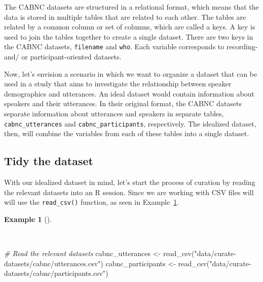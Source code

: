 \documentclass[
  letterpaper,
  DIV=11,
  numbers=noendperiod]{scrreport}
\newenvironment{Shaded}{\begin{snugshade}}{\end{snugshade}}
\newcommand{\CommentTok}[1]{\textcolor[rgb]{0.00,0.00,0.00}{\textit{#1}}}
\newcommand{\FunctionTok}[1]{\textcolor[rgb]{0.00,0.00,0.00}{#1}}
\newcommand{\NormalTok}[1]{\textcolor[rgb]{0.00,0.00,0.00}{#1}}
\newcommand{\OtherTok}[1]{\textcolor[rgb]{0.00,0.00,0.00}{#1}}
\newcommand{\StringTok}[1]{\textcolor[rgb]{0.00,0.00,0.00}{#1}}
\theoremstyle{definition}
\newtheorem{example}{Example}[chapter]
\theoremstyle{remark}
\begin{document}
The CABNC datasets are structured in a relational format, which means
that the data is stored in multiple tables that are related to each
other. The tables are related by a common column or set of columns,
which are called a keys. A key is used to join the tables together to
create a single dataset. There are two keys in the CABNC datasets,
\texttt{filename} and \texttt{who}. Each variable corresponds to
recording- and/ or participant-oriented datasets.

Now, let's envision a scenario in which we want to organize a dataset
that can be used in a study that aims to investigate the relationship
between speaker demographics and utterances. An ideal dataset would
contain information about speakers and their utterances. In their
original format, the CABNC datasets separate information about
utterances and speakers in separate tables, \texttt{cabnc\_utterances}
and \texttt{cabnc\_participants}, respectively. The idealized dataset,
then, will combine the variables from each of these tables into a single
dataset.

\hypertarget{tidy-the-dataset}{%
\subsection{Tidy the dataset}\label{tidy-the-dataset}}

With our idealized dataset in mind, let's start the process of curation
by reading the relevant datasets into an R session. Since we are working
with CSV files will will use the \texttt{read\_csv()} function, as seen
in Example~\ref{exm-cd-cabnc-read}.

\begin{example}[]\protect\hypertarget{exm-cd-cabnc-read}{}\label{exm-cd-cabnc-read}

~

\begin{Shaded}
\begin{Highlighting}[]
\CommentTok{\# Read the relevant datasets}
\NormalTok{cabnc\_utterances }\OtherTok{\textless{}{-}} 
  \FunctionTok{read\_csv}\NormalTok{(}\StringTok{"data/curate{-}datasets/cabnc/utterances.csv"}\NormalTok{)}
\NormalTok{cabnc\_participants }\OtherTok{\textless{}{-}} 
  \FunctionTok{read\_csv}\NormalTok{(}\StringTok{"data/curate{-}datasets/cabnc/participants.csv"}\NormalTok{)}
\end{Highlighting}
\end{Shaded}

\end{example}
\end{document}
